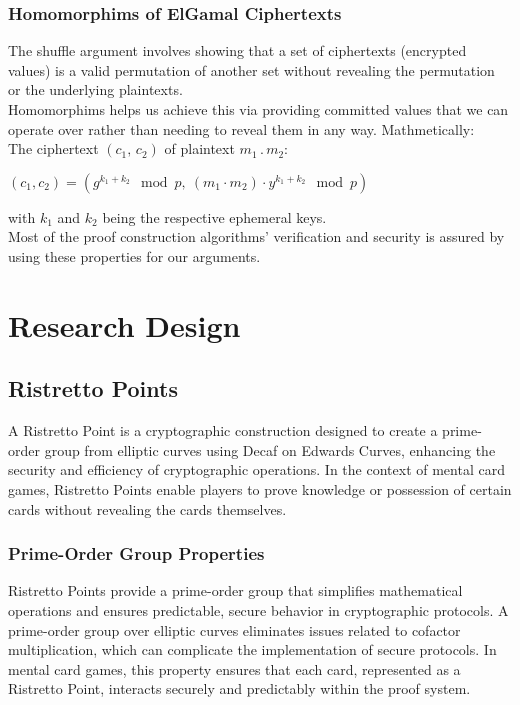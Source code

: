 \documentclass[12pt,a4paper]{report}
\begin{document}
\subsubsection{Homomorphims of ElGamal Ciphertexts}
The shuffle argument involves showing that a set of ciphertexts (encrypted values) is a valid permutation of another set without revealing the permutation or the underlying plaintexts.\\
Homomorphims helps us achieve this via providing committed values that we can operate over rather than needing to reveal them in any way. Mathmetically:\\
The ciphertext $(c_1,\,c_2)$ of plaintext $m_1\,.\,m_2$:\\
\begin{center}
$(c_1, c_2) = \left( g^{k_1 + k_2} \mod p, \ (m_1 \cdot m_2) \cdot y^{k_1 + k_2} \mod p \right)$
\end{center}
with $k_1$ and $k_2$ being the respective ephemeral keys.\\
Most of the proof construction algorithms' verification and security is assured 
by using these properties for our arguments.

\section{Research Design}
\subsection{Ristretto Points}
A Ristretto Point is a cryptographic construction designed to create a
prime-order group from elliptic curves using Decaf on Edwards Curves, 
enhancing the security and efficiency of cryptographic operations. 
In the context of mental card games, Ristretto Points 
enable players to prove knowledge or 
possession of certain cards without revealing the cards themselves.

\subsubsection{Prime-Order Group Properties}
Ristretto Points provide a prime-order group that simplifies 
mathematical operations and ensures predictable, 
secure behavior in cryptographic protocols.
A prime-order group over elliptic curves eliminates issues related to cofactor multiplication, which can complicate the implementation of secure protocols.
In mental card games, this property ensures that each card, represented as a Ristretto Point, interacts securely and predictably within the proof system.
\end{document}
